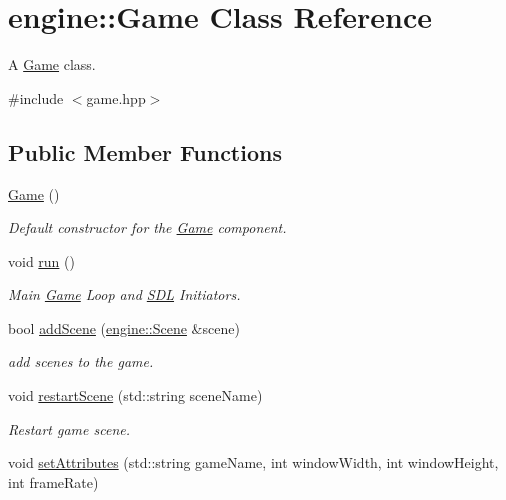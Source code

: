 \hypertarget{classengine_1_1_game}{}\section{engine\+:\+:Game Class Reference}
\label{classengine_1_1_game}


A \hyperlink{classengine_1_1_game}{Game} class.  




{\ttfamily \#include $<$game.\+hpp$>$}

\subsection*{Public Member Functions}
\begin{DoxyCompactItemize}
\item 
\hyperlink{classengine_1_1_game_ad59df6562a58a614fda24622d3715b65}{Game} ()
\begin{DoxyCompactList}\small\item\em Default constructor for the \hyperlink{classengine_1_1_game}{Game} component. \end{DoxyCompactList}\item 
void \hyperlink{classengine_1_1_game_a1ab78f5ed0d5ea879157357cf2fb2afa}{run} ()
\begin{DoxyCompactList}\small\item\em Main \hyperlink{classengine_1_1_game}{Game} Loop and \hyperlink{classengine_1_1_s_d_l}{S\+DL} Initiators. \end{DoxyCompactList}\item 
bool \hyperlink{classengine_1_1_game_a0c4045649cdb6a1e1a804b6f1c136ec3}{add\+Scene} (\hyperlink{classengine_1_1_scene}{engine\+::\+Scene} \&scene)
\begin{DoxyCompactList}\small\item\em add scenes to the game. \end{DoxyCompactList}\item 
void \hyperlink{classengine_1_1_game_ae3e212e771960fda160fd298306460c8}{restart\+Scene} (std\+::string scene\+Name)
\begin{DoxyCompactList}\small\item\em Restart game scene. \end{DoxyCompactList}\item 
void \hyperlink{classengine_1_1_game_a8f6fd890cc6a5c4e4fc8fa5b325d0ca3}{set\+Attributes} (std\+::string game\+Name, int window\+Width, int window\+Height, int frame\+Rate)

\end{DoxyCompactItemize}
